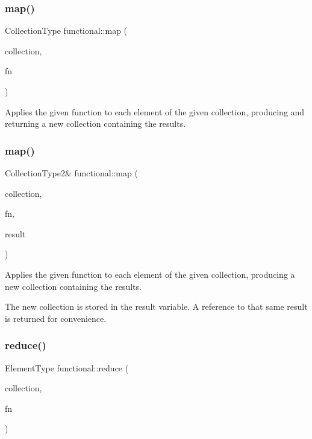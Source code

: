 \subsubsection{\texorpdfstring{map()}{map()}\hspace{0.1cm}{\footnotesize\ttfamily [1/2]}}
{\footnotesize\ttfamily Collection\+Type functional\+::map (\begin{DoxyParamCaption}\item[{Collection\+Type}]{collection,  }\item[{std\+::function$<$ Element\+Type(const Element\+Type \&)$>$}]{fn }\end{DoxyParamCaption})}



Applies the given function to each element of the given collection, producing and returning a new collection containing the results. 

\mbox{\label{namespacefunctional_a51165ce4b506c99325632c62390ea71d}} 
\subsubsection{\texorpdfstring{map()}{map()}\hspace{0.1cm}{\footnotesize\ttfamily [2/2]}}
{\footnotesize\ttfamily Collection\+Type2\& functional\+::map (\begin{DoxyParamCaption}\item[{Collection\+Type}]{collection,  }\item[{std\+::function$<$ Element\+Type(const Element\+Type \&)$>$}]{fn,  }\item[{Collection\+Type2 \&}]{result }\end{DoxyParamCaption})}



Applies the given function to each element of the given collection, producing a new collection containing the results. 

The new collection is stored in the \textquotesingle{}result\textquotesingle{} variable. A reference to that same result is returned for convenience. \mbox{\label{namespacefunctional_af6242058989d7f1416afaf20fb503c2c}} 
\subsubsection{\texorpdfstring{reduce()}{reduce()}\hspace{0.1cm}{\footnotesize\ttfamily [1/2]}}
{\footnotesize\ttfamily Element\+Type functional\+::reduce (\begin{DoxyParamCaption}\item[{Collection\+Type}]{collection,  }\item[{std\+::function$<$ Element\+Type(const Element\+Type \&, const Element\+Type \&)$>$}]{fn }\end{DoxyParamCaption})}




